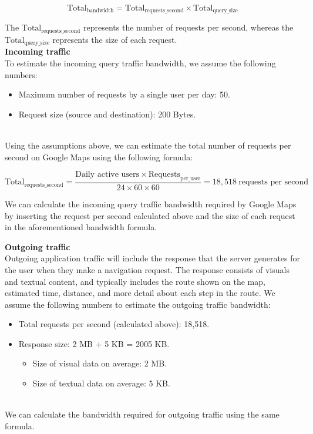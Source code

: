 \[
\text{Total}_{\text{bandwidth}} = \text{Total}_{\text{requests\_second}} \times \text{Total}_{\text{query\_size}}
\]

The \protect{}\label{katex_inline_uFIyIMQsLKzDId9JFKZ6L}{{{\(\text{Total}_{\text{requests\_second}}\)}}} represents the number of requests per second, whereas the \protect{}\label{katex_inline_fO1Hj7qZJzMXZXNzIPecO}{{{\(\text{Total}_{\text{query\_size}}\)}}} represents the size of each request.
\\
\textbf{Incoming traffic}
\\
To estimate the incoming query traffic bandwidth, we assume the following numbers:

\begin{itemize}
\item
\protect{}\label{YqdHQC9TPG7V5s0zCbgTB}
Maximum number of requests by a single user per day: 50.
\item
\protect{}\label{pHhkq7IxXk-ZKC1rLAoR9}
Request size (source and destination): 200 Bytes.
\end{itemize}
\\
Using the assumptions above, we can estimate the total number of requests per second on Google Maps using the following formula:

\[
\text{Total}_{\text{requests\_second}} = \frac{\text{Daily active users} \times \text{Requests}_{\text{per\_user}}}{24 \times 60 \times 60} = 18,518\ \text{requests per second}
\]

We can calculate the incoming query traffic bandwidth required by Google Maps by inserting the request per second calculated above and the size of each request in the aforementioned bandwidth formula.

\textbf{Outgoing traffic}
\\
Outgoing application traffic will include the response that the server generates for the user when they make a navigation request. The response consists of visuals and textual content, and typically includes the route shown on the map, estimated time, distance, and more detail about each step in the route. We assume the following numbers to estimate the outgoing traffic bandwidth:

\begin{itemize}
\item
\protect{}\label{Z9islS0NVhATbJpINtdXn}
Total requests per second (calculated above): 18,518.
\item
\protect{}\label{vTROfz7qyDoueMB-nQDLw}
Response size: 2 MB + 5 KB = 2005 KB.

\begin{itemize}
\item
Size of visual data on average: 2 MB.
\item
Size of textual data on average: 5 KB.
\end{itemize}
\end{itemize}
\\
We can calculate the bandwidth required for outgoing traffic using the same formula.


